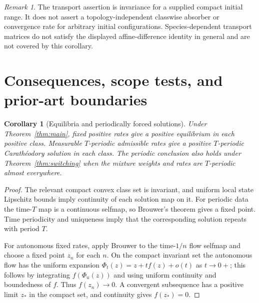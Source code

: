 \documentclass[11pt]{article}
\newtheorem{corollary}[theorem]{Corollary}
\theoremstyle{definition}
\theoremstyle{remark}
\newtheorem{remark}[theorem]{Remark}
\numberwithin{equation}{section}
\begin{document}
\begin{remark}
The transport assertion is invariance for a supplied compact
initial range. It does not assert a topology-independent
classwise absorber or convergence rate for arbitrary initial
configurations. Species-dependent transport matrices do not
satisfy the displayed affine-difference identity in general
and are not covered by this corollary.
\end{remark}

\section{Consequences, scope tests, and prior-art boundaries}
\label{sec:scope}

\begin{corollary}[Equilibria and periodically forced solutions]
\label{cor:periodic}
Under Theorem~\ref{thm:main}, fixed positive rates give a
positive equilibrium in each positive class. Measurable
$T$-periodic admissible rates give a positive $T$-periodic
Carath\'eodory solution in each class. The periodic conclusion
also holds under Theorem~\ref{thm:switching} when the mixture
weights and rates are $T$-periodic almost everywhere.
\end{corollary}
\begin{proof}
The relevant compact convex class set is invariant, and
uniform local state Lipschitz bounds imply continuity of
each solution map on it. For periodic data the time-$T$
map is a continuous selfmap, so Brouwer's theorem gives a
fixed point. Time periodicity and uniqueness imply that
the corresponding solution repeats with period $T$.

For autonomous fixed rates, apply Brouwer to the time-$1/n$
flow selfmap and choose a fixed point $z_n$ for each $n$.
On the compact invariant set the autonomous flow has the
uniform expansion $\Phi_t(z)=z+t f(z)+o(t)$ as $t\to0+$;
this follows by integrating $f(\Phi_u(z))$ and using uniform
continuity and boundedness of $f$. Thus $f(z_n)\to0$.
A convergent subsequence has a positive limit $z_*$ in the
compact set, and continuity gives $f(z_*)=0$.
\end{proof}
\end{document}
